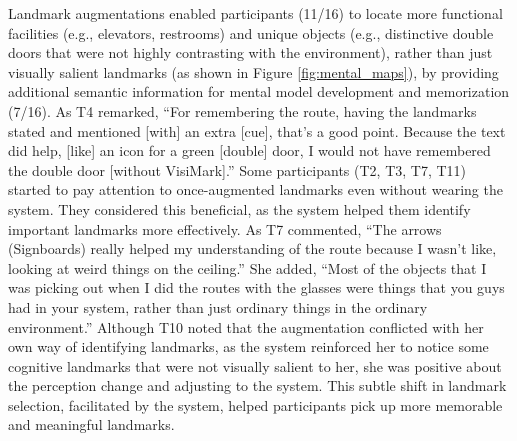 Landmark augmentations enabled participants (11/16) to locate more functional facilities (e.g., elevators, restrooms) and unique objects (e.g., distinctive double doors that were not highly contrasting with the environment), rather than just visually salient landmarks (as shown in Figure \ref{fig:mental_maps}), by providing additional semantic information for mental model development and memorization (7/16). As T4 remarked, ``For remembering the route, having the landmarks stated and mentioned [with] an extra [cue], that's a good point. Because the text did help, [like] an icon for a green [double] door, I would not have remembered the double door [without VisiMark].'' 
Some participants (T2, T3, T7, T11) started to pay attention to once-augmented landmarks even without wearing the system. They considered this beneficial, as the system helped them identify important landmarks more effectively. As T7 commented, ``The arrows (Signboards) really helped my understanding of the route because I wasn't like, looking at weird things on the ceiling.'' She added, ``Most of the objects that I was picking out when I did the routes with the glasses were things that you guys had in your system, rather than just ordinary things in the ordinary environment.'' Although T10 noted that the augmentation conflicted with her own way of identifying landmarks, as the system reinforced her to notice some cognitive landmarks that were not visually salient to her, she was positive about the perception change and adjusting to the system. This subtle shift in landmark selection, facilitated by the system, helped participants pick up more memorable and meaningful landmarks.

